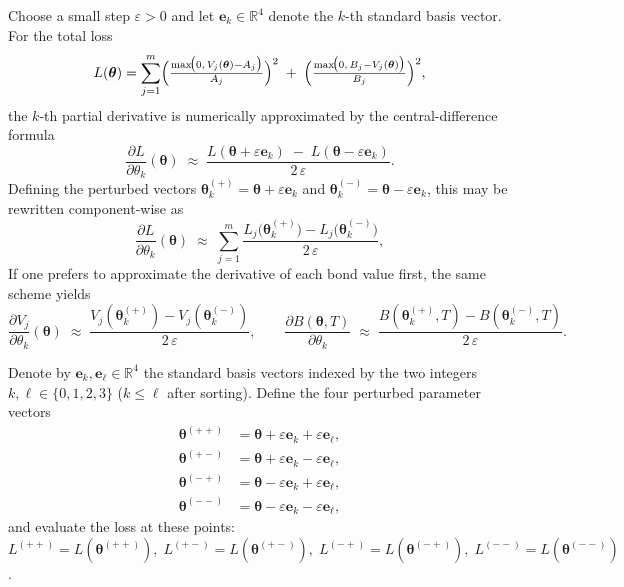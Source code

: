 \documentclass[12pt]{article}
\begin{document}
Choose a small step \(\varepsilon>0\) and let \(\mathbf e_k\in\mathbb R^{4}\) denote the \(k\)-th standard basis vector.  For the total loss
\[
  L(\boldsymbol{\theta})=\sum_{j=1}^{m}
  \Bigl(\tfrac{\max\!\bigl(0,\,V_j(\boldsymbol{\theta})-A_j\bigr)}{A_j}\Bigr)^{2}
 \;+\;
  \Bigl(\tfrac{\max\!\bigl(0,\,B_j-V_j(\boldsymbol{\theta})\bigr)}{B_j}\Bigr)^{2},
\]
the \(k\)-th partial derivative is numerically approximated by the central-difference formula  
\[
  \frac{\partial L}{\partial\theta_k}(\boldsymbol{\theta})
  \;\approx\;
  \frac{L(\boldsymbol{\theta}+\varepsilon\mathbf e_k)\;-\;L(\boldsymbol{\theta}-\varepsilon\mathbf e_k)}
       {2\,\varepsilon}.
\]
Defining the perturbed vectors \(\boldsymbol{\theta}^{(+)}_k = \boldsymbol{\theta}+\varepsilon\mathbf e_k\) and \(\boldsymbol{\theta}^{(-)}_k = \boldsymbol{\theta}-\varepsilon\mathbf e_k\), this may be rewritten component-wise as  
\[
  \frac{\partial L}{\partial\theta_k}(\boldsymbol{\theta})
  \;\approx\;
  \sum_{j=1}^{m}
  \frac{L_j\bigl(\boldsymbol{\theta}^{(+)}_k\bigr)
        -L_j\bigl(\boldsymbol{\theta}^{(-)}_k\bigr)}
       {2\,\varepsilon},
\]
If one prefers to approximate the derivative of each bond value first, the same scheme yields  
\[
  \frac{\partial V_j}{\partial\theta_k}(\boldsymbol{\theta})
  \;\approx\;
  \frac{V_j(\boldsymbol{\theta}^{(+)}_k)-V_j(\boldsymbol{\theta}^{(-)}_k)}{2\,\varepsilon},
  \qquad
  \frac{\partial B(\boldsymbol{\theta},T)}{\partial\theta_k}
  \;\approx\;
  \frac{B(\boldsymbol{\theta}^{(+)}_k,T)-B(\boldsymbol{\theta}^{(-)}_k,T)}{2\,\varepsilon}.
\]

Denote by \(\mathbf e_k,\mathbf e_\ell\in\mathbb R^{4}\) the standard basis vectors indexed by the two integers \(k,\ell\in\{0,1,2,3\}\) (\(k\le\ell\) after sorting).  
Define the four perturbed parameter vectors
\[
\begin{aligned}
\boldsymbol{\theta}^{(++)}&=\boldsymbol{\theta}+\varepsilon\mathbf e_k+\varepsilon\mathbf e_\ell,\\
\boldsymbol{\theta}^{(+-)}&=\boldsymbol{\theta}+\varepsilon\mathbf e_k-\varepsilon\mathbf e_\ell,\\
\boldsymbol{\theta}^{(-+)}&=\boldsymbol{\theta}-\varepsilon\mathbf e_k+\varepsilon\mathbf e_\ell,\\
\boldsymbol{\theta}^{(--)}&=\boldsymbol{\theta}-\varepsilon\mathbf e_k-\varepsilon\mathbf e_\ell,
\end{aligned}
\]
and evaluate the loss at these points:
\(L^{(++)}=L(\boldsymbol{\theta}^{(++)}),\;
  L^{(+-)}=L(\boldsymbol{\theta}^{(+-)}),\;
  L^{(-+)}=L(\boldsymbol{\theta}^{(-+)}),\;
  L^{(--)}=L(\boldsymbol{\theta}^{(--)})\).
  
\end{document}
